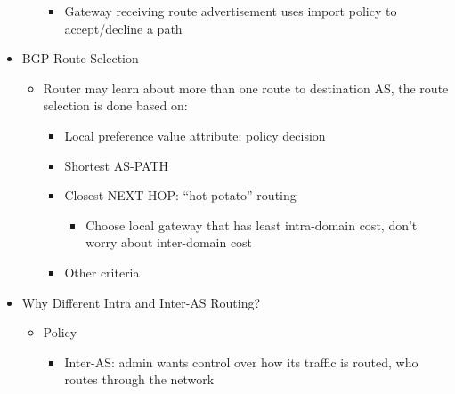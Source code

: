 \begin{itemize}
\begin{itemize}
\begin{itemize}
          \item Gateway receiving route advertisement uses import policy to accept/decline a path

        \end{itemize}

    \end{itemize}

  \item BGP Route Selection

    \begin{itemize}

      \item Router may learn about more than one route to destination AS, the route selection is done based on:

        \begin{itemize}

          \item Local preference value attribute: policy decision

          \item Shortest AS-PATH

          \item Closest NEXT-HOP: ``hot potato'' routing

            \begin{itemize}

              \item Choose local gateway that has least intra-domain cost, don't worry about inter-domain cost

            \end{itemize}

          \item Other criteria

        \end{itemize}

    \end{itemize}

  \item Why Different Intra and Inter-AS Routing?

    \begin{itemize}

      \item Policy

        \begin{itemize}

          \item Inter-AS: admin wants control over how its traffic is routed, who routes through the network


\end{itemize}
\end{itemize}
\end{itemize}
